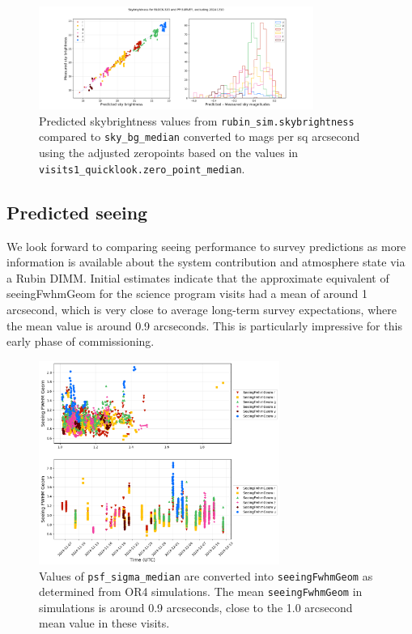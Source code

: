 \begin{figure}
    \centering
    \includegraphics[width=0.8\textwidth]{sp/sky.png}
    \caption{Predicted skybrightness values from \texttt{rubin\_sim.skybrightness} compared to
      \texttt{sky\_bg\_median} converted to mags per sq arcsecond  using the adjusted zeropoints based on the values in  \texttt{visits1\_quicklook.zero\_point\_median}.}
    \label{fig:sky}
    \end{figure}


\subsection{Predicted seeing}

We look forward to comparing seeing performance to survey predictions as more information is available about the system contribution and atmosphere state via a Rubin DIMM. Initial estimates indicate that the approximate equivalent of seeingFwhmGeom for the science program visits had a mean of around 1 arcsecond, which is very close to average long-term survey expectations, where the mean value is around 0.9 arcseconds. This is particularly impressive for this early phase of commissioning. 

\begin{figure}
    \centering
    \includegraphics[width=0.7\textwidth]{sp/seeing.png}
    \caption{Values of \texttt{psf\_sigma\_median} are converted into \texttt{seeingFwhmGeom} as determined from OR4 simulations. The mean \texttt{seeingFwhmGeom} in simulations is around 0.9 arcseconds, close to the 1.0 arcsecond mean value in these visits.}
    \label{fig:seeing}
    \end{figure}


